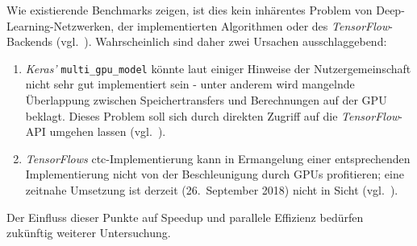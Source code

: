 Wie existierende Benchmarks zeigen, ist dies kein inhärentes Problem von Deep-Learning-Netzwerken, der implementierten
Algorithmen oder des \textit{TensorFlow}-Backends (vgl.~\cite{tensorflowbench}). Wahrscheinlich sind daher zwei
Ursachen ausschlaggebend:

\begin{enumerate}
    \item \textit{Keras'} \texttt{multi\_gpu\_model} könnte laut einiger Hinweise der Nutzergemeinschaft nicht sehr gut
          implementiert sein - unter anderem wird mangelnde Überlappung zwischen Speichertransfers und Berechnungen auf
          der GPU beklagt. Dieses Problem soll sich durch direkten Zugriff auf die \textit{TensorFlow}-API umgehen
          lassen (vgl.~\cite{zamecnik2017}).
    \item \textit{TensorFlows} \gls{ctc}-Implementierung kann in Ermangelung einer entsprechenden Implementierung nicht
          von der Beschleunigung durch GPUs profitieren; eine zeitnahe Umsetzung ist derzeit (26.\ September 2018) nicht
          in Sicht (vgl.~\cite{hibbert2016}).
\end{enumerate}

Der Einfluss dieser Punkte auf Speedup und parallele Effizienz bedürfen zukünftig weiterer Untersuchung.
